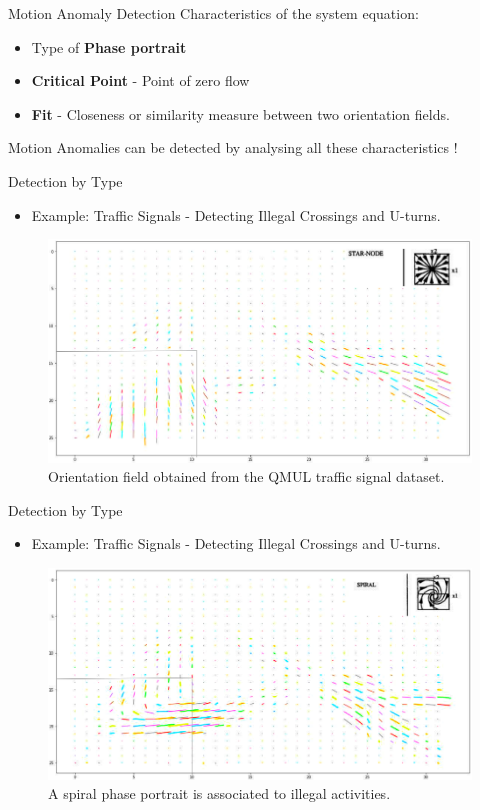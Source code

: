 \documentclass{beamer}
\begin{document}
\begin{frame}{Motion Anomaly Detection}
Characteristics of the system equation:
\begin{itemize}
\item Type of \textbf{Phase portrait}
\item \textbf{Critical Point} - Point of zero flow
\item \textbf{Fit} - Closeness or similarity measure between two orientation fields.
\end{itemize}

Motion Anomalies can be detected by analysing all these characteristics !

\end{frame}
\begin{frame}{Detection by Type}
\begin{itemize}
\item  Example: Traffic Signals - Detecting Illegal Crossings and U-turns.
\end{itemize} 
\begin{figure}[h]
            	\centering
            	\includegraphics[width =0.65\linewidth]{images/star_pdf1.png} 
            	\caption{Orientation field obtained from the QMUL traffic signal dataset.}
            \end{figure}
\end{frame}



\begin{frame}{Detection by Type}
\begin{itemize}
\item  Example: Traffic Signals - Detecting Illegal Crossings and U-turns.
\end{itemize} 
\begin{figure}[h]
            	\centering
            	\includegraphics[width =0.65\linewidth]{images/spiral_pdf1.png} 
            	\caption{A spiral phase portrait is associated to illegal activities.}
            \end{figure}
\end{frame}
\end{document}
